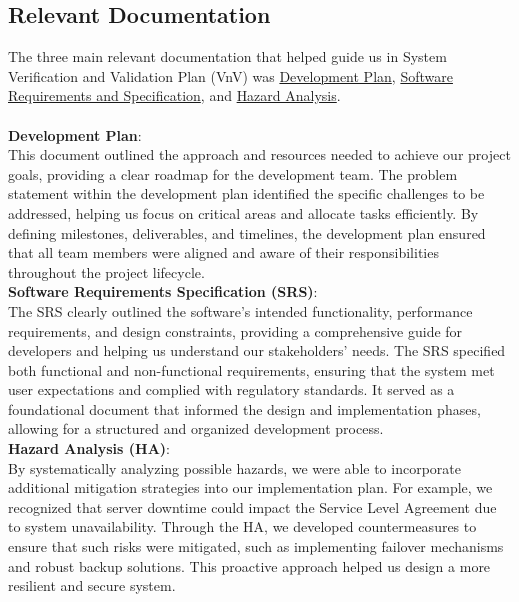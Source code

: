 \documentclass[12pt, titlepage]{article}
\begin{document}
\subsection{Relevant Documentation}

The three main relevant documentation that helped guide us in System Verification and Validation Plan (VnV) was \href{https://github.com/RezaJodeiri/CXR-Capstone/blob/main/docs/DevelopmentPlan/DevelopmentPlan.pdf}{Development Plan}, \href{https://github.com/RezaJodeiri/CXR-Capstone/blob/main/docs/SRS/SRS.pdf}{Software Requirements and Specification}, and 
\href{https://github.com/RezaJodeiri/CXR-Capstone/blob/main/docs/HazardAnalysis/HazardAnalysis.pdf}{Hazard Analysis}.
\\\\
\textbf{Development Plan}:\\

\noindent This document outlined the approach and resources needed to achieve our project goals, providing a clear roadmap for the development team. The problem statement within the development plan identified the specific challenges to be addressed, helping us focus on critical areas and allocate tasks efficiently. By defining milestones, deliverables, and timelines, the development plan ensured that all team members were aligned and aware of their responsibilities throughout the project lifecycle.\\

\noindent \textbf{Software Requirements Specification (SRS)}:\\

\noindent The SRS clearly outlined the software’s intended functionality, performance requirements, and design constraints, providing a comprehensive guide for developers and helping us understand our stakeholders' needs. The SRS specified both functional and non-functional requirements, ensuring that the system met user expectations and complied with regulatory standards. It served as a foundational document that informed the design and implementation phases, allowing for a structured and organized development process.\\

\noindent \textbf{Hazard Analysis (HA)}:\\

\noindent  By systematically analyzing possible hazards, we were able to incorporate additional mitigation strategies into our implementation plan. For example, we recognized that server downtime could impact the Service Level Agreement due to system unavailability. Through the HA, we developed countermeasures to ensure that such risks were mitigated, such as implementing failover mechanisms and robust backup solutions. This proactive approach helped us design a more resilient and secure system.\\
\end{document}

